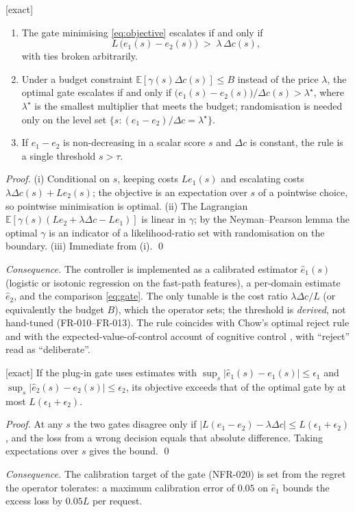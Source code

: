 \begin{theorem} \textnormal{[exact]}
\label{thm:gate}
\begin{enumerate}[label=(\roman*)]
\item The gate minimising \eqref{eq:objective} escalates if and only if
\begin{equation}
\label{eq:gate}
L\,\big(e_1(s)-e_2(s)\big)\;>\;\lambda\,\Delta c(s),
\end{equation}
with ties broken arbitrarily.
\item Under a budget constraint $\mathbb E[\gamma(s)\Delta c(s)]\le B$
instead of the price $\lambda$, the optimal gate escalates if and only if
$\big(e_1(s)-e_2(s)\big)/\Delta c(s)>\lambda^\star$, where $\lambda^\star$ is
the smallest multiplier that meets the budget; randomisation is needed only on
the level set $\{s:(e_1-e_2)/\Delta c=\lambda^\star\}$.
\item If $e_1-e_2$ is non-decreasing in a scalar score $s$ and $\Delta c$ is
constant, the rule is a single threshold $s>\tau$.
\end{enumerate}
\end{theorem}
\begin{proof}
(i) Conditional on $s$, keeping costs $Le_1(s)$ and escalating costs
$\lambda\Delta c(s)+Le_2(s)$; the objective is an expectation over $s$ of a
pointwise choice, so pointwise minimisation is optimal. (ii) The Lagrangian
$\mathbb E[\gamma(s)(L e_2+\lambda\Delta c-Le_1)]$ is linear in $\gamma$; by the
Neyman--Pearson lemma the optimal $\gamma$ is an indicator of a likelihood-ratio
set with randomisation on the boundary. (iii) Immediate from (i). \qed
\end{proof}
\emph{Consequence.} The controller is implemented as a calibrated estimator
$\hat e_1(s)$ (logistic or isotonic regression on the fast-path features),
a per-domain estimate $\hat e_2$, and the comparison \eqref{eq:gate}. The only
tunable is the cost ratio $\lambda\Delta c/L$ (or equivalently the budget $B$),
which the operator sets; the threshold is \emph{derived}, not hand-tuned
(FR-010--FR-013). The rule coincides with Chow's optimal reject rule
\cite{chow1970reject} and with the expected-value-of-control account of
cognitive control \cite{shenhav2013evc}, with ``reject'' read as
``deliberate''.

\begin{proposition} \textnormal{[exact]}
\label{prop:miscal}
If the plug-in gate uses estimates with
$\sup_s|\hat e_1(s)-e_1(s)|\le\epsilon_1$ and
$\sup_s|\hat e_2(s)-e_2(s)|\le\epsilon_2$, its objective exceeds that of the
optimal gate by at most $L(\epsilon_1+\epsilon_2)$.
\end{proposition}
\begin{proof}
At any $s$ the two gates disagree only if
$|L(e_1-e_2)-\lambda\Delta c|\le L(\epsilon_1+\epsilon_2)$, and the loss from a
wrong decision equals that absolute difference. Taking expectations over $s$
gives the bound. \qed
\end{proof}
\emph{Consequence.} The calibration target of the gate (NFR-020) is set from
the regret the operator tolerates: a maximum calibration error of $0.05$ on
$\hat e_1$ bounds the excess loss by $0.05L$ per request.

